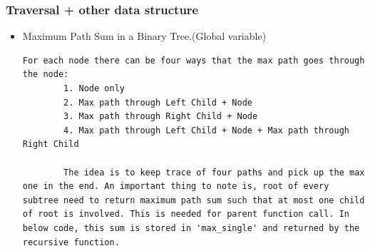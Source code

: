 \documentclass[a4paper,11pt,twoside]{book}
\begin{document}
\subsubsection{Traversal + other data structure}
\begin{itemize}
	\item Maximum Path Sum in a Binary Tree.(Global variable)
	\begin{lstlisting}[breaklines]
		For each node there can be four ways that the max path goes through the node:
		1. Node only
		2. Max path through Left Child + Node
		3. Max path through Right Child + Node
		4. Max path through Left Child + Node + Max path through Right Child
		
		The idea is to keep trace of four paths and pick up the max one in the end. An important thing to note is, root of every subtree need to return maximum path sum such that at most one child of root is involved. This is needed for parent function call. In below code, this sum is stored in 'max_single' and returned by the recursive function.
	\end{lstlisting}
\end{itemize}
\end{document}
